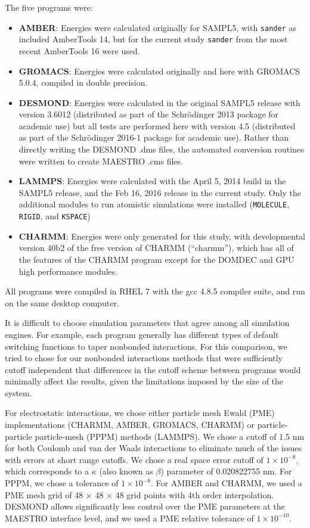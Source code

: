 The five programs were:
\begin{itemize} 
\item {\bf AMBER}: Energies were calculated originally for SAMPL5, with
  {\tt sander} as included AmberTools 14, but for the current study
  {\tt sander} from the most recent AmberTools 16 were used.
\item {\bf GROMACS}: Energies were calculated originally and here with
  GROMACS 5.0.4, compiled in double precision.
\item {\bf DESMOND}: Energies were calculated in the original
  SAMPL5 release with version 3.6012 (distributed as part of the Schr\"odinger
  2013 package for academic use) but all tests are performed here with
  version 4.5 (distributed as part of the Schr\"odinger
  2016-1 package for academic use).  Rather than directly writing the
  DESMOND .dms files, the automated conversion routines were written to
  create MAESTRO .cms files.
\item {\bf LAMMPS}: Energies were calculated with the April 5,
  2014 build in the SAMPL5 release, and the Feb 16, 2016 release in
  the current study. Only the additional modules to run atomistic
  simulations were installed ({\tt MOLECULE}, {\tt RIGID}, and {\tt KSPACE})
\item {\bf CHARMM}: Energies were only generated for this study, with
  developmental version 40b2 of the free version of CHARMM (``charmm''), which has all of the features of the CHARMM program except for the DOMDEC and GPU high performance modules.
\end{itemize}
All programs were compiled in RHEL 7 with the gcc 4.8.5 compiler
suite, and run on the same desktop computer.

It is difficult to choose simulation parameters that agree among all
simulation engines. For example, each program generally has different
types of default switching functions to taper nonbonded
interactions. For this comparison, we tried to chose for our nonbonded
interactions methods that were sufficiently cutoff independent that
differences in the cutoff scheme between programs would minimally
affect the results, given the limitations imposed by the size of the
system.

For electrostatic interactions, we chose either particle mesh Ewald
(PME) implementations (CHARMM, AMBER, GROMACS, CHARMM) or
particle-particle particle-mesh (PPPM) methods (LAMMPS). We chose a
cutoff of 1.5 nm for both Coulomb and van der Waals interactions to
eliminate much of the issues with errors at short range cutoffs. We
chose a real space error cutoff of $1\times 10^{-8}$, which corresponds
to a $\kappa$ (also known as $\beta$) parameter of 0.020822755 nm.  For PPPM, we
chose a tolerance of $1\times10^{-8}$. 
For AMBER and
CHARMM, we used a PME mesh grid of 48 $\times$ 48 $\times$ 48 grid
points with 4th order interpolation. DESMOND allows significantly less
control over the PME parameters at the MAESTRO interface level, and we
used a PME relative tolerance of $1\times 10^{-10}$. 

